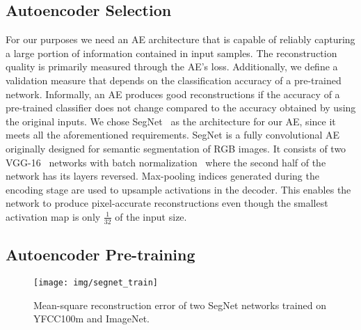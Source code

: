 \documentclass[10pt,twocolumn,a4paper]{article}
\begin{document}
\subsection{Autoencoder Selection}
For our purposes we need an AE architecture that is capable of reliably capturing a large portion of information contained in input samples.
The reconstruction quality is primarily measured through the AE's loss.
Additionally, we define a validation measure that depends on the classification accuracy of a pre-trained network.
Informally, an AE produces good reconstructions if the accuracy of a pre-trained classifier does not change compared to the accuracy obtained by using the original inputs.
We chose SegNet~\cite{badrinarayanan2015segnet2} as the architecture for our AE, since it meets all the aforementioned requirements.
SegNet is a fully convolutional AE originally designed for semantic segmentation of RGB images.
It consists of two VGG-16~\cite{Simonyan14c} networks with batch normalization~\cite{ioffe2015batch} where the second half of the network has its layers reversed.
Max-pooling indices generated during the encoding stage are used to upsample activations in the decoder.
This enables the network to produce pixel-accurate reconstructions even though the smallest activation map is only $\frac{1}{32}$ of the input size.

\subsection{Autoencoder Pre-training}\begin{figure}
	\texttt{[image: img/segnet\_train]}
	\caption{Mean-square reconstruction error of two SegNet networks trained on YFCC100m and ImageNet.}
	\label{fig:ae-training}
\end{figure}
\end{document}
